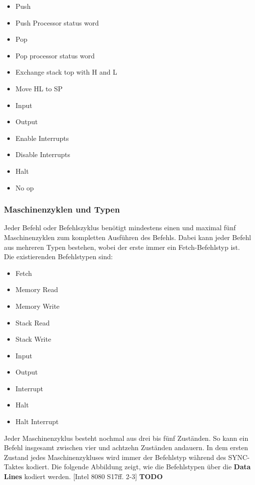 \documentclass[12pt]{article}
\newcommand{\todo}{\textbf{TODO}}
\begin{document}
\begin{multicols}{2}
\begin{itemize}
\item Push
\item Push Processor status word
\item Pop
\item Pop processor status word
\item Exchange stack top with H and L
\item Move HL to SP
\item Input
\item Output
\item Enable Interrupts
\item Disable Interrupts
\item Halt
\item No op
\end{itemize}
\end{multicols}


\subsubsection{Maschinenzyklen und Typen}
Jeder Befehl oder Befehlszyklus benötigt mindestens einen und maximal fünf Maschinenzyklen zum kompletten Ausführen des Befehls. Dabei kann jeder Befehl aus mehreren Typen bestehen, wobei der erste immer ein Fetch-Befehlstyp ist. Die existierenden Befehlstypen sind:

\begin{itemize}
\item Fetch
\item Memory Read
\item Memory Write
\item Stack Read
\item Stack Write
\item Input
\item Output
\item Interrupt
\item Halt
\item Halt Interrupt
\end{itemize}

\noindent
Jeder Maschinenzyklus besteht nochmal aus drei bis fünf Zuständen. So kann ein Befehl insgesamt zwischen vier und achtzehn Zuständen andauern.
In dem ersten Zustand jedes Maschinenzykluses wird immer der Befehlstyp während des SYNC-Taktes kodiert. Die folgende Abbildung zeigt, wie die Befehlstypen über die \textbf{Data Lines} kodiert werden. [Intel 8080 S17ff. 2-3] \todo
\end{document}
